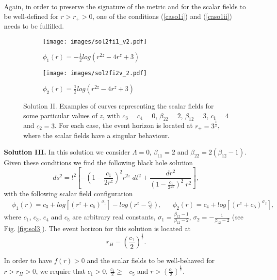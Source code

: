 \documentclass[sn-mathphys,Numbered]{sn-jnl}%
\theoremstyle{thmstyleone}%
\theoremstyle{thmstyletwo}%
\theoremstyle{thmstylethree}%
\begin{document}
Again, in order to preserve the signature of the metric and for the scalar fields to be well-defined for $r>r_+>0$, one of the conditions (\ref{caso1i}) and (\ref{caso1ii}) needs to be fulfilled.
%
\begin{figure}[]

\begin{subfigure}{0.5\textwidth}
\texttt{[image: images/sol2fi1\_v2.pdf]} 
\caption{$\phi_1(r)=-\frac{1}{2}log\left(r^{2z}-4r^z+3\right)$}
\label{fig:subim1}
\end{subfigure}
\begin{subfigure}{0.5\textwidth}
\texttt{[image: images/sol2fi2v\_2.pdf]}
\caption{$\phi_2(r)=\frac{1}{2}log\left(r^{2z}-4r^z+3\right)$}
\label{fig:subim2}
\end{subfigure}

\caption{Solution II. Examples of curves representing the scalar fields for some particular values of $z$, with $c_3=c_4=0$, $\beta_{22}=2$,  $\beta_{12}=3$, $c_1=4$ and $c_2=3$. For each case, the event horizon is located at $r_+=3^{\frac{1}{z}}$, where the scalar fields have a singular behaviour.}
\label{fig:sol2}
\end{figure}

\textbf{Solution III.}
In this solution we consider $\Lambda= 0$, $\beta_{11} = 2$ and $\beta_{22}= 2\left(\beta_{12} - 1 \right)$. Given these conditions we find the following black hole solution
%
\begin{equation} \label{blackhole III}
    ds^2=l^2\left[-\left(1-\frac{c_1}{2r^z}\right)^2 r^{2z}\;dt^{2}+\frac{dr^2}{ \left(1-\frac{c_1}{2r^z}\right)^2 \;r^2} \right],
\end{equation}
%
with the following scalar field configuration
%
\begin{align} \label{scalars solIII}
    &\phi_1(r) = c_3 + log\left[\left(r^z+c_5 \right)^{\sigma_1}\right] - log\left(r^z- \frac{c_1}{2}\right), &
    &\phi_2(r)= c_4 + log\left[\left(r^z+c_5 \right)^{\sigma_2}\right],
\end{align}
where $c_1$, $c_3$, $c_4$ and $c_5$ are arbitrary real constants, $\sigma_1=\frac{ \beta_{12}-1}{ \beta_{12}-2}$,  $\sigma_2=-\frac{ 1 }{ \beta_{12}-2}$ (see Fig. \ref{fig:sol3}).
The event horizon for this solution is located at
%
\begin{equation} \label{rhi}
   r_H= \left(\frac{c_1}{2} \right)^{\frac{1}{z}}.
\end{equation}

In order to have $f(r)>0$ and the scalar fields to be well-behaved for $r> r_H> 0$, we require that $ c_1>0$, $ \frac{c_1}{2} \geq -c_5$ and $r > \left(\frac{c_1}{2}\right)^{\frac{1}{z}}$.
\end{document}

